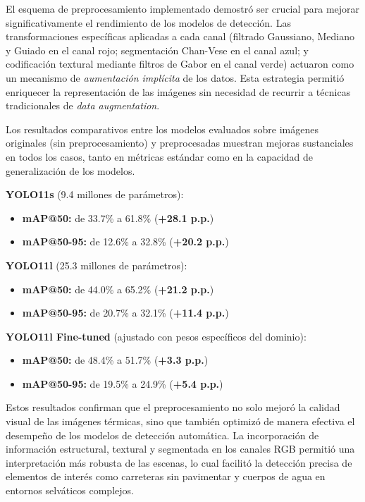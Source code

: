 El esquema de preprocesamiento implementado demostró ser crucial para mejorar significativamente el rendimiento de los modelos de detección. Las transformaciones específicas aplicadas a cada canal (filtrado Gaussiano, Mediano y Guiado en el canal rojo; segmentación Chan-Vese en el canal azul; y codificación textural mediante filtros de Gabor en el canal verde) actuaron como un mecanismo de \textit{aumentación implícita} de los datos. Esta estrategia permitió enriquecer la representación de las imágenes sin necesidad de recurrir a técnicas tradicionales de \textit{data augmentation}.

Los resultados comparativos entre los modelos evaluados sobre imágenes originales (sin preprocesamiento) y preprocesadas muestran mejoras sustanciales en todos los casos, tanto en métricas estándar como en la capacidad de generalización de los modelos.

\vspace{1em}
\noindent\textbf{YOLO11s} (9.4 millones de parámetros):
\begin{itemize}
    \item \textbf{mAP@50:} de 33.7\% a 61.8\% (\textbf{+28.1 p.p.})
    \item \textbf{mAP@50-95:} de 12.6\% a 32.8\% (\textbf{+20.2 p.p.})
\end{itemize}

\noindent\textbf{YOLO11l} (25.3 millones de parámetros):
\begin{itemize}
    \item \textbf{mAP@50:} de 44.0\% a 65.2\% (\textbf{+21.2 p.p.})
    \item \textbf{mAP@50-95:} de 20.7\% a 32.1\% (\textbf{+11.4 p.p.})
\end{itemize}

\noindent\textbf{YOLO11l Fine-tuned} (ajustado con pesos específicos del dominio):
\begin{itemize}
    \item \textbf{mAP@50:} de 48.4\% a 51.7\% (\textbf{+3.3 p.p.})
    \item \textbf{mAP@50-95:} de 19.5\% a 24.9\% (\textbf{+5.4 p.p.})
\end{itemize}

\vspace{0.5em}
Estos resultados confirman que el preprocesamiento no solo mejoró la calidad visual de las imágenes térmicas, sino que también optimizó de manera efectiva el desempeño de los modelos de detección automática. La incorporación de información estructural, textural y segmentada en los canales RGB permitió una interpretación más robusta de las escenas, lo cual facilitó la detección precisa de elementos de interés como carreteras sin pavimentar y cuerpos de agua en entornos selváticos complejos.

